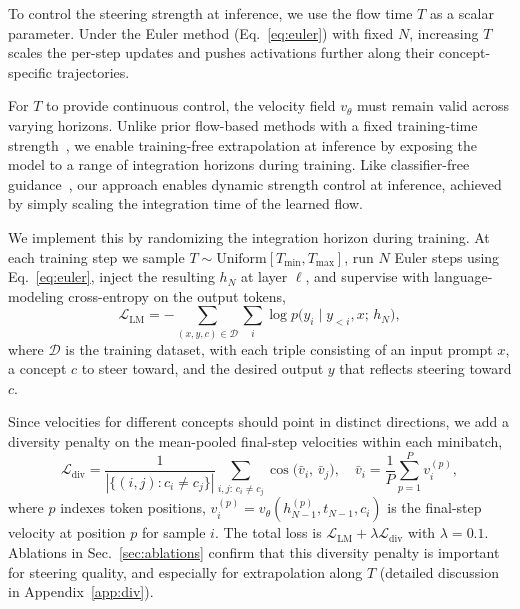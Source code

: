 \documentclass{article}
\newcommand{\vt}{v_\theta}
\newcommand{\cD}{\mathcal{D}}
\newcommand{\cL}{\mathcal{L}}
\begin{document}
To control the steering strength at inference, we use the flow time $T$ as a scalar parameter. Under the Euler method (Eq.~\ref{eq:euler}) with fixed $N$, increasing $T$ scales the per-step updates and pushes activations further along their concept-specific trajectories.

For $T$ to provide continuous control, the velocity field $\vt$ must remain valid across varying horizons. Unlike prior flow-based methods with a fixed training-time strength~\citep{Lipman2023}, we enable training-free extrapolation at inference by exposing the model to a range of integration horizons during training. Like classifier-free guidance~\citep{Ho2022}, our approach enables dynamic strength control at inference, achieved by simply scaling the integration time of the learned flow.

We implement this by randomizing the integration horizon during training. At each training step we sample $T \sim \text{Uniform}[T_\text{min}, T_\text{max}]$, run $N$ Euler steps using Eq.~\ref{eq:euler}, inject the resulting $h_N$ at layer $\ell$, and supervise with language-modeling cross-entropy on the output tokens,
\begin{equation}
\label{eq:lm_loss}
\cL_\text{LM} = -\sum_{(x, y, c) \in \cD} \sum_{i} \log p\bigl(y_i \mid y_{<i}, x;\, h_N\bigr),
\end{equation}
where $\cD$ is the training dataset, with each triple consisting of an input prompt $x$, a concept $c$ to steer toward, and the desired output $y$ that reflects steering toward $c$.

Since velocities for different concepts should point in distinct directions, we add a diversity penalty on the mean-pooled final-step velocities within each minibatch,
\begin{equation}
\label{eq:div_loss}
\cL_\text{div} = \frac{1}{|\{(i,j): c_i \neq c_j\}|} \sum_{i,j:\, c_i \neq c_j} \cos\bigl(\bar{v}_i,\, \bar{v}_j\bigr),
\quad \bar{v}_i = \frac{1}{P}\sum_{p=1}^{P} v_i^{(p)},
\end{equation}
where $p$ indexes token positions, $v_i^{(p)} = \vt(h_{N-1}^{(p)}, t_{N-1}, c_i)$ is the final-step velocity at position $p$ for sample $i$. The total loss is $\cL_\text{LM} + \lambda \cL_\text{div}$ with $\lambda = 0.1$. Ablations in Sec.~\ref{sec:ablations} confirm that this diversity penalty is important for steering quality, and especially for extrapolation along $T$ (detailed discussion in Appendix~\ref{app:div}).

\end{document}
